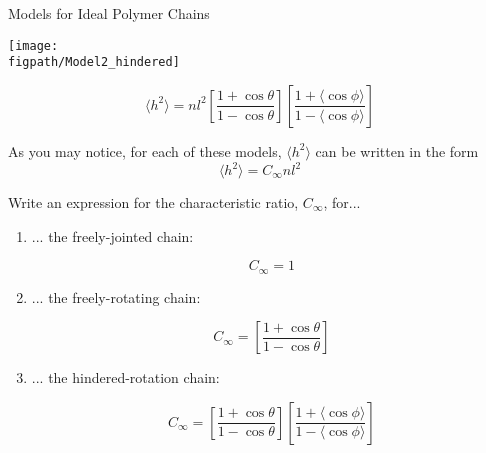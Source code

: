 \begin{activity}{Models for Ideal Polymer Chains}
\begin{model}
\begin{enumerate}
			\begin{minipage}[c]{0.45\textwidth}
				\centerline{\texttt{[image: \\figpath/Model2\_hindered]}}
			\end{minipage}\begin{minipage}[c]{0.45\textwidth}
				\begin{equation*}
					\langle h^2\rangle = n l^2 \left[\frac{1+\cos\theta}{1-\cos\theta}\right] \left[\frac{1+\langle \cos\phi\rangle}{1-\langle\cos\phi\rangle}\right]
				\end{equation*}
			\end{minipage}
			
	\end{enumerate}
	
\end{model}

\begin{ctqs}

	\question As you may notice, for each of these models, $\langle h^2\rangle$ can be written in the form \label{\labelbase:ctq:C}
		\begin{equation*}
			\langle h^2 \rangle = C_\infty n l^2
		\end{equation*}
		
		Write an expression for the characteristic ratio, $C_\infty$, for...
		
		\begin{enumerate}
			\item ... the freely-jointed chain:
	
		\begin{solution}[0.5in]
			\begin{equation*}
				C_\infty = 1
			\end{equation*}
		\end{solution}
			
			\item ... the freely-rotating chain:
	
		\begin{solution}[0.75in]
			\begin{equation*}
				C_\infty = \left[\frac{1+\cos\theta}{1-\cos\theta}\right]
			\end{equation*}
		\end{solution}
			
			\item ... the hindered-rotation chain:
	
		\begin{solution}[0.75in]
			\begin{equation*}
				C_\infty = \left[\frac{1+\cos\theta}{1-\cos\theta}\right] \left[\frac{1+\langle \cos\phi\rangle}{1-\langle\cos\phi\rangle}\right]
			\end{equation*}
		\end{solution}
		\end{enumerate}


\end{ctqs}
\end{activity}

